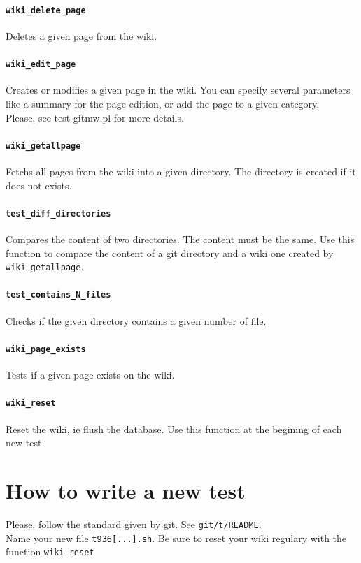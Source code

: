 \documentclass[11pt]{article}
\begin{document}
\paragraph*{\lstinline!wiki_delete_page!}
Deletes a given page from the wiki.

\paragraph*{\lstinline!wiki_edit_page!}
Creates or modifies a given page in the wiki. You can specify several parameters like a summary for the page edition, or add the page to a given category.\\
Please, see test-gitmw.pl for more details.

\paragraph*{\lstinline!wiki_getallpage!}
Fetchs all pages from the wiki into a given directory. The directory is created if it does not exists.

\paragraph*{\lstinline!test_diff_directories!}
Compares the content of two directories. The content must be the same.
Use this function to compare the content of a git directory and a wiki one created by \lstinline!wiki_getallpage!.

\paragraph*{\lstinline!test_contains_N_files!}
Checks if the given directory contains a given number of file.

\paragraph*{\lstinline!wiki_page_exists!}
Tests if a given page exists on the wiki.

\paragraph*{\lstinline!wiki_reset!}
Reset the wiki, ie flush the database. Use this function at the begining of each new test.

\section{How to write a new test}
Please, follow the standard given by git. See \lstinline!git/t/README!.\\
Name your new file \lstinline!t936[...].sh!.
Be sure to reset your wiki regulary with the function \lstinline!wiki_reset!

  
\end{document}
